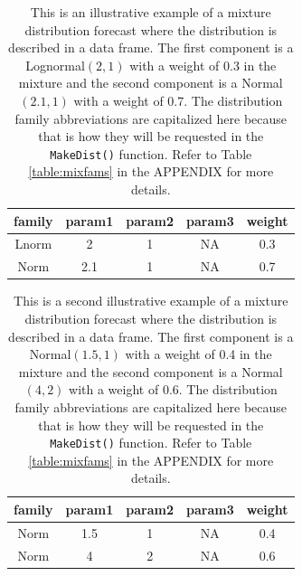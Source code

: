 \documentclass[11pt,notitlepage]{isuthesis}
\begin{document}
\begin{table}[h!]
\centering
 \begin{tabular}{|c|c|c|c|c|}
 \hline
    family & param1 & param2 & param3 & weight
    \\ \hline
    Lnorm & 2 & 1 & NA & 0.3  \\
    Norm & 2.1 & 1 & NA & 0.7 \\
 \hline
 \end{tabular}
  \begin{minipage}{11cm}
\captionsetup{font=scriptsize}
 \caption[Illustrative forecast 1]{This is an illustrative example of a
 mixture distribution
 forecast where the distribution is described in a data frame. The first 
 component is a Lognormal$(2,1)$ with a weight of 0.3 in the mixture and the 
 second component is a Normal$(2.1,1)$ with a weight of 0.7. The distribution
 family abbreviations are capitalized here because that is how they will be
 requested in the \texttt{MakeDist()} function. Refer to Table
 \ref{table:mixfams} in the APPENDIX for more details. }
 \label{tab:preddf1}
 \end{minipage}
\end{table}

\begin{table}[h!]
\centering
 \begin{tabular}{|c|c|c|c|c|}
 \hline
    family & param1 & param2 & param3 & weight
    \\ \hline
    Norm & 1.5 & 1 & NA & 0.4  \\
    Norm & 4 & 2 & NA & 0.6 \\
 \hline
 \end{tabular}
  \begin{minipage}{11cm}
\captionsetup{font=scriptsize}
 \caption[Illustrative forecast 2]{This is a second
 illustrative example of a mixture distribution
 forecast where the distribution is described in a data frame. The first 
 component is a Normal$(1.5,1)$ with a weight of 0.4 in the mixture and the 
 second component is a Normal$(4,2)$ with a weight of 0.6.
 The distribution
 family abbreviations are capitalized here because that is how they will be
 requested in the \texttt{MakeDist()} function. Refer to Table
 \ref{table:mixfams} in the APPENDIX for more details.}
 \label{tab:preddf2}
 \end{minipage}
\end{table}
\end{document}
